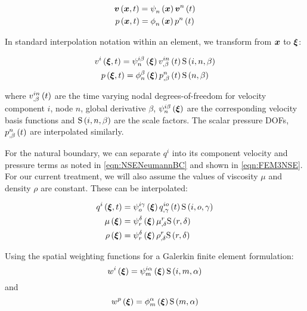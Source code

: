 \begin{gather}
  \fnof{\vectr{v}}{\vectr{x},t}=\gbfn{n}{}{\vectr{x}}\fnof{\nodept{\vectr{v}}{n}}{t}\\
  \fnof{p}{\vectr{x},t}=\altgbfn{n}{}{\vectr{x}}\fnof{\nodept{p}{n}}{t}
\end{gather}

In standard interpolation notation within an element, we transform from
$\vectr{x}$ to $\vectr{\xi}$:

\begin{gather}
  \fnof{v^{i}}{\vectr{\xi},t}=\idxgbfn{i}{n}{\beta}{\vectr{\xi}}
  \fnof{\idxnodedof{v}{i}{n}{\beta}}{t}\idxgsf{i}{n}{\beta}\\
  \fnof{p}{\vectr{\xi},t}=\altgbfn{n}{\beta}{\vectr{\xi}}
  \fnof{\nodedof{p}{n}{\beta}}{t}\gsf{n}{\beta}
\end{gather}

where $\fnof{\idxnodedof{v}{i}{n}{\beta}}{t}$ are the time varying nodal
degrees-of-freedom for velocity component $i$, node $n$, global derivative
$\beta$, $\idxgbfn{i}{n}{\beta}{\vectr{\xi}}$ are the corresponding velocity
basis functions and $\idxgsf{i}{n}{\beta}$ are the scale factors. The scalar
pressure DOFs, $\fnof{\nodedof{p}{n}{\beta}}{t}$ are interpolated
similarly.

For the natural boundary, we can separate $q^{i}$ into its component velocity
and pressure terms as noted in \ref{eqn:NSENeumannBC} and shown in
\ref{eqn:FEM3NSE}. For our current treatment, we will also assume the values
of viscosity $\mu$ and density $\rho$ are constant. These can be interpolated:

\begin{equation}
  \begin{split}
    \fnof{q^{i}}{\vectr{\xi},t} &= \idxgbfn{i}{o}{\gamma}{\vectr{\xi}}
      \fnof{\idxnodedof{q}{i}{o}{\gamma}}{t}\idxgsf{i}{o}{\gamma} \\
    \fnof{\mu}{\vectr{\xi}} &=\gbfn{r}{\delta}{\vectr{\xi}}
    \nodedof{\mu}{r}{\delta}\gsf{r}{\delta} \\
    \fnof{\rho}{\vectr{\xi}} &=\gbfn{r}{\delta}{\vectr{\xi}}\nodedof{\rho}{r}{\delta}
    \gsf{r}{\delta} \\
  \end{split}
\end{equation}

Using the spatial weighting functions for a Galerkin finite element
formulation:
\begin{equation}
  \fnof{w^{i}}{\vectr{\xi}}=\idxgbfn{i}{m}{\alpha}{\vectr{\xi}}\idxgsf{i}{m}{\alpha}
\end{equation}
and
\begin{equation}
  \fnof{w^{p}}{\vectr{\xi}}=\altgbfn{m}{\alpha}{\vectr{\xi}}\gsf{m}{\alpha}
\end{equation}


